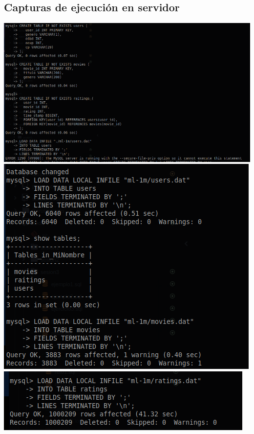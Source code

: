 \documentclass[10pt]{article}
\begin{document}
\subsection{Capturas de ejecución en servidor}
\begin{center}
  \includegraphics[scale=0.25]{imgs/1.png}\\
  \includegraphics[scale=0.25]{imgs/2.png}\\
  \includegraphics[scale=0.25]{imgs/3.png}\\

\end{center}
\end{document}
